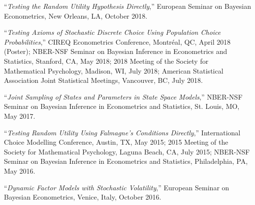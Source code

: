 \documentclass[12pt]{article}
\begin{document}
``{\it Testing the Random Utility Hypothesis Directly},''
European Seminar on Bayesian Econometrics,
New Orleans, LA,
October 2018.

``{\it Testing Axioms of Stochastic Discrete Choice Using Population Choice Probabilities},''
CIREQ Econometrics Conference,
Montr\'eal, QC,
April 2018 (Poster);
NBER-NSF Seminar on Bayesian Inference in Econometrics and Statistics,
Stanford, CA,
May 2018;
2018 Meeting of the Society for Mathematical Psychology,
Madison, WI,
July 2018;
American Statistical Association Joint Statistical Meetings,
Vancouver, BC,
July 2018.

``{\it Joint Sampling of States and Parameters in State Space Models},''
NBER-NSF Seminar on Bayesian Inference in Econometrics and Statistics,
St. Louis, MO,
May 2017.

``{\it Testing Random Utility Using Falmagne's Conditions Directly},''
International Choice Modelling Conference,
Austin, TX,
May 2015;
2015 Meeting of the Society for Mathematical Psychology,
Laguna Beach, CA,
July 2015;
NBER-NSF Seminar on Bayesian Inference in Econometrics and Statistics,
Philadelphia, PA,
May 2016.

``{\it Dynamic Factor Models with Stochastic Volatility},''
European Seminar on Bayesian Econometrics,
Venice, Italy,
October 2016.




\end{document}
